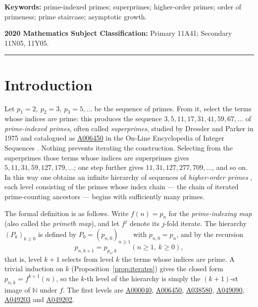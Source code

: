 \documentclass[11pt,a4paper]{article}
\theoremstyle{plain}
\theoremstyle{definition}
\newcommand{\N}{\mathbb{N}}
\begin{document}
\vspace{4pt}
\noindent\textbf{Keywords:} prime-indexed primes; superprimes; higher-order
primes; order of primeness; prime staircase; asymptotic growth.

\smallskip
\noindent\textbf{2020 Mathematics Subject Classification:}
Primary 11A41; Secondary 11N05, 11Y05.

\vspace{4pt}
\noindent\rule{\textwidth}{0.4pt}

\section{Introduction}\label{sec:intro}

Let $p_1=2,\ p_2=3,\ p_3=5,\ldots$ be the sequence of primes. From it,
select the terms whose indices are prime: this produces the sequence
$3,5,11,17,31,41,59,67,\ldots$ of \emph{prime-indexed primes}, often called
\emph{superprimes}, studied by Dressler and Parker in 1975
\cite{DresslerParker} and catalogued as
\href{https://oeis.org/A006450}{A006450} in the On-Line Encyclopedia of
Integer Sequences \cite{OEIS}. Nothing prevents iterating the construction.
Selecting from the superprimes those terms whose indices are superprimes
gives $5,11,31,59,127,179,\ldots$; one step further gives
$11,31,127,277,709,\ldots$, and so on. In this way one obtains an infinite
hierarchy of sequences of \emph{higher-order primes}
\cite{HigherOrderWiki,MiskaTothZmija}, each level consisting of the primes
whose index chain --- the chain of iterated prime-counting ancestors ---
begins with sufficiently many primes.

The formal definition is as follows. Write $f(n)=p_n$ for the
\emph{prime-indexing map} (also called the \emph{primeth map}), and let
$f^{j}$ denote its $j$-fold iterate. The hierarchy
$(P_k)_{k\ge 0}$ is defined by $P_0=(p_{n,0})_{n\ge 1}$ with $p_{n,0}=p_n$,
and by the recursion
\begin{equation}\label{eq:hierarchy}
  p_{n,k+1}=p_{p_n,k}\qquad(n\ge 1,\ k\ge 0),
\end{equation}
that is, level $k+1$ selects from level $k$ the terms whose indices are
prime. A trivial induction on $k$ (Proposition~\ref{prop:iterates}) gives
the closed form $p_{n,k}=f^{k+1}(n)$, so the $k$-th level of the hierarchy
is simply the $(k+1)$-st image of $\N$ under $f$. The first levels are
\href{https://oeis.org/A000040}{A000040},
\href{https://oeis.org/A006450}{A006450},
\href{https://oeis.org/A038580}{A038580},
\href{https://oeis.org/A049090}{A049090},
\href{https://oeis.org/A049203}{A049203} and
\href{https://oeis.org/A049202}{A049202}.
\end{document}
